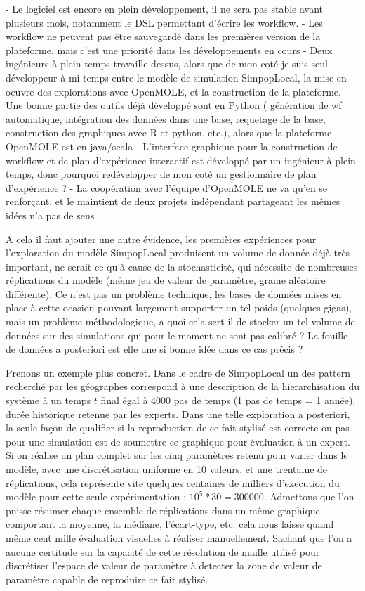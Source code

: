 - Le logiciel est encore en plein développement, il ne sera pas stable avant plusieurs mois, notamment le DSL permettant d'écrire les workflow.
- Les workflow ne peuvent pas être sauvegardé dans les premières version de la plateforme, mais c'est une priorité dans les développements en cours
- Deux ingénieurs à plein temps travaille dessus, alors que de mon coté je suis seul développeur à mi-temps entre le modèle de simulation SimpopLocal, la mise en oeuvre des explorations avec OpenMOLE, et la construction de la plateforme. 
- Une bonne partie des outils déjà développé sont en Python ( génération de wf automatique, intégration des données dans une base, requetage de la base, construction des graphiques avec R et python,  etc.), alors que la plateforme OpenMOLE est en java/scala
- L'interface graphique pour la construction de workflow et de plan d'expérience interactif est développé par un ingénieur à plein temps, donc pourquoi redévelopper de mon coté un gestionnaire de plan d'expérience ?
- La coopération avec l'équipe d'OpenMOLE ne va qu'en se renforçant, et le maintient de deux projets indépendant partageant les mêmes idées n'a pas de sens

A cela il faut ajouter une autre évidence, les premières expériences pour l'exploration du modèle SimpopLocal produisent un volume de donnée déjà très important, ne serait-ce qu'à cause de la stochasticité, qui nécessite de nombreuses réplications du modèle (même jeu de valeur de paramètre, graine aléatoire différente). Ce n'est pas un problème technique, les bases de données mises en place à cette ocasion pouvant largement supporter un tel poids (quelques gigas), mais un problème méthodologique, a quoi cela sert-il de stocker un tel volume de données sur des simulations qui pour le moment ne sont pas calibré ? La fouille de données a posteriori est elle une si bonne idée dans ce cas précis ?

Prenons un exemple plus concret. Dans le cadre de SimpopLocal un des pattern recherché par les géographes correspond à une description de la hierarchisation du système à un temps $t$ final égal à 4000 pas de temps (1 pas de temps = 1 année), durée historique retenue par les experts. Dans une telle exploration a posteriori, la seule façon de qualifier si la reproduction de ce fait stylisé est correcte ou pas pour une simulation est de soumettre ce graphique pour évaluation à un expert. Si on réalise un plan complet sur les cinq paramètres retenu pour varier dans le modèle, avec une discrétisation uniforme en 10 valeurs, et une trentaine de réplications, cela représente vite quelques centaines de milliers d'execution du modèle pour cette seule expérimentation : $10^{5} * 30 = \num{300000}$. Admettons que l'on puisse résumer chaque ensemble de réplications dans un même graphique comportant la moyenne, la médiane, l'écart-type, etc. cela nous laisse quand même cent mille évaluation visuelles à réaliser manuellement. Sachant que l'on a aucune certitude sur la capacité de cette résolution de maille utilisé pour discrétiser l'espace de valeur de paramètre à detecter la zone de valeur de paramètre capable de reproduire ce fait stylisé.

